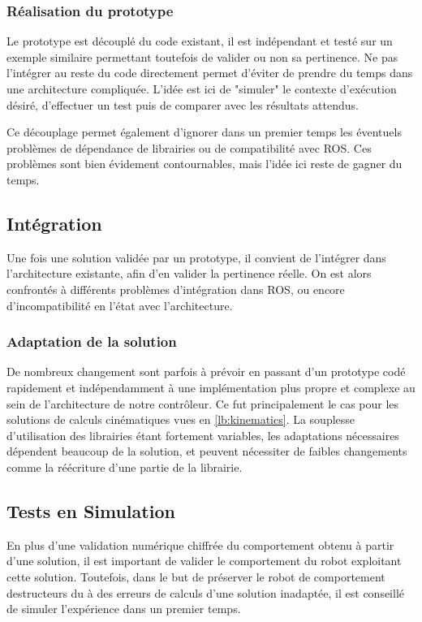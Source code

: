 \documentclass{tnreport}
\begin{document}
\subsubsection{Réalisation du prototype}
Le prototype est découplé du code existant, il est indépendant et testé sur un exemple similaire permettant toutefois de valider ou non sa pertinence. Ne pas l'intégrer au reste du code directement permet d'éviter de prendre du temps dans une architecture compliquée. L'idée est ici de "simuler" le contexte d'exécution désiré, d'effectuer un test puis de comparer avec les résultats attendus. 

Ce découplage permet également d'ignorer dans un premier temps les éventuels problèmes de dépendance de librairies ou de compatibilité avec ROS. Ces problèmes sont bien évidement contournables, mais l'idée ici reste de gagner du temps. 

\subsection{Intégration}
Une fois une solution validée par un prototype, il convient de l'intégrer dans l'architecture existante, afin d'en valider la pertinence réelle. On est alors confrontés à différents problèmes d'intégration dans ROS, ou encore d'incompatibilité en l'état avec l'architecture.

\subsubsection{Adaptation de la solution}
De nombreux changement sont parfois à prévoir en passant d'un prototype codé rapidement et indépendamment à une implémentation plus propre et complexe au sein de l'architecture de notre contrôleur. Ce fut principalement le cas pour les solutions de calculs cinématiques vues en \ref{lb:kinematics}. La souplesse d'utilisation des librairies étant fortement variables, les adaptations nécessaires dépendent beaucoup de la solution, et peuvent nécessiter de faibles changements comme la réécriture d'une partie de la librairie.    

\subsection{Tests en Simulation}
En plus d'une validation numérique chiffrée du comportement obtenu à partir d'une solution, il est important de valider le comportement du robot exploitant cette solution. Toutefois, dans le but de préserver le robot de comportement destructeurs du à des erreurs de calculs d'une solution inadaptée, il est conseillé de simuler l'expérience dans un premier temps. 
\end{document}
